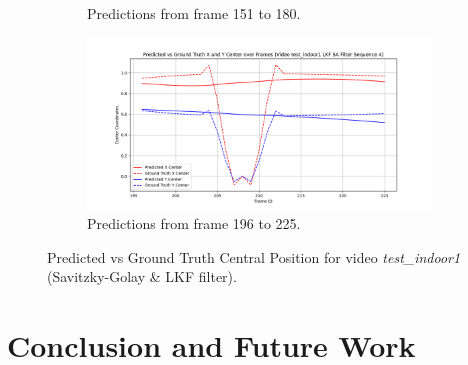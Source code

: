 \documentclass[12pt,oneside]{book} %
\begin{document}
\begin{figure}[H]
\begin{subfigure}[t]{0.45\textwidth}
        \caption{Predictions from frame 151 to 180.}
        \label{fig:framework-test_indoor1-savgol-3}
    \end{subfigure}
    \hfill
    \begin{subfigure}[t]{0.45\textwidth}
        \includegraphics[width=\textwidth]{figures/framework/test_indoor1 LKF SA Filter - 4.png}
        \caption{Predictions from frame 196 to 225.}
        \label{fig:framework-test_indoor1-savgol-4}
    \end{subfigure}
    \caption{Predicted vs Ground Truth Central Position for video \textit{test\_indoor1} (Savitzky-Golay \& LKF filter). }
    \label{fig:framework-test_indoor1-savgol}
\end{figure}

\chapter{Conclusion and Future Work}\label{chap:conclusion}

\appendix




\end{document}
